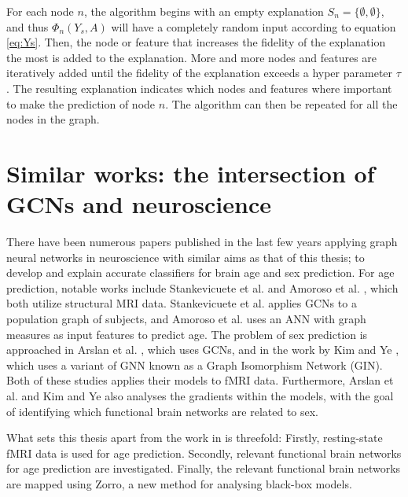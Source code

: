 For each node $n$, the algorithm begins with an empty explanation $S_n = \{\emptyset, \emptyset\}$, and thus $\Phi_n(Y_s, A)$ will have a completely random input according to equation \ref{eq:Ys}. Then, the node or feature that increases the fidelity of the explanation the most is added to the explanation. More and more nodes and features are iteratively added until the fidelity of the explanation exceeds a hyper parameter $\tau$. The resulting explanation indicates which nodes and features where important to make the prediction of node $n$. The algorithm can then be repeated for all the nodes in the graph.

\section{Similar works: the intersection of GCNs and neuroscience}


There have been numerous papers published in the last few years applying graph neural networks in neuroscience with similar aims as that of this thesis; to develop and explain accurate classifiers for brain age and sex prediction. For age prediction, notable works include Stankevicuete et al. \cite{stankeviciute} and Amoroso et al. \cite{amoroso_multiplex_age}, which both utilize structural MRI data. Stankevicuete et al. applies GCNs to a population graph of subjects, and Amoroso et al. uses an ANN with graph measures as input features to predict age. The problem of sex prediction is approached in Arslan et al. \cite{arslan}, which uses GCNs, and in the work by Kim and Ye \cite{understanding_gnn}, which uses a variant of GNN known as a Graph Isomorphism Network (GIN). Both of these studies applies their models to fMRI data. Furthermore, Arslan et al. and Kim and Ye also analyses the gradients within the models, with the goal of identifying which functional brain networks are related to sex. 

What sets this thesis apart from the work in \cite{stankeviciute, amoroso_multiplex_age, arslan, understanding_gnn} is threefold: Firstly, resting-state fMRI data is used for age prediction. Secondly, relevant functional brain networks for age prediction are investigated. Finally, the relevant functional brain networks are mapped using Zorro, a new method for analysing black-box models.

